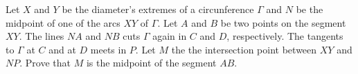 Let $X$ and $Y$ be the diameter's extremes of a circunference $\Gamma$ and $N$ be the midpoint of one of the arcs $XY$ of $\Gamma$. Let $A$ and $B$ be two points on the segment $XY$. The lines $NA$ and $NB$ cuts $\Gamma$ again in $C$ and $D$,  respectively.  The tangents to $\Gamma$ at $C$ and at $D$ meets in $P$. Let $M$ the the intersection point between $XY$ and $NP$. Prove that $M$ is the midpoint of the segment $AB$.